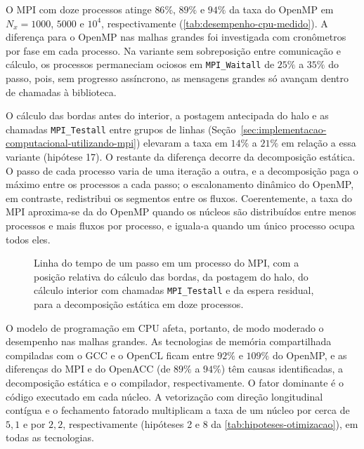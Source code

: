 O MPI com doze processos atinge \(86\%\), \(89\%\) e \(94\%\) da taxa do OpenMP em \(N_x = 1000\), \(5000\) e \(10^4\), respectivamente (\autoref{tab:desempenho-cpu-medido}).
A diferença para o OpenMP nas malhas grandes foi investigada com cronômetros por fase em cada processo.
Na variante sem sobreposição entre comunicação e cálculo, os processos permaneciam ociosos em \texttt{MPI\_Waitall} de \(25\%\) a \(35\%\) do passo, pois, sem progresso assíncrono, as mensagens grandes só avançam dentro de chamadas à biblioteca.

O cálculo das bordas antes do interior, a postagem antecipada do halo e as chamadas \texttt{MPI\_Testall} entre grupos de linhas (Seção~\ref{sec:implementacao-computacional-utilizando-mpi}) elevaram a taxa em \(14\%\) a \(21\%\) em relação a essa variante (hipótese 17).
O restante da diferença decorre da decomposição estática.
O passo de cada processo varia de uma iteração a outra, e a decomposição paga o máximo entre os processos a cada passo; o escalonamento dinâmico do OpenMP, em contraste, redistribui os segmentos entre os fluxos.
Coerentemente, a taxa do MPI aproxima-se da do OpenMP quando os núcleos são distribuídos entre menos processos e mais fluxos por processo, e iguala-a quando um único processo ocupa todos eles.

\begin{figure}[H]
  \centering
  \caption{Linha do tempo de um passo em um processo do MPI, com a posição relativa do cálculo das bordas, da postagem do halo, do cálculo interior com chamadas \texttt{MPI\_Testall} e da espera residual, para a decomposição estática em doze processos.}
  \label{fig:mpi-linha-do-tempo}
\end{figure}

O modelo de programação em CPU afeta, portanto, de modo moderado o desempenho nas malhas grandes.
As tecnologias de memória compartilhada compiladas com o GCC e o OpenCL ficam entre \(92\%\) e \(109\%\) do OpenMP, e as diferenças do MPI e do OpenACC (de \(89\%\) a \(94\%\)) têm causas identificadas, a decomposição estática e o compilador, respectivamente.
O fator dominante é o código executado em cada núcleo.
A vetorização com direção longitudinal contígua e o fechamento fatorado multiplicam a taxa de um núcleo por cerca de \(5{,}1\) e por \(2{,}2\), respectivamente (hipóteses 2 e 8 da \autoref{tab:hipoteses-otimizacao}), em todas as tecnologias.

